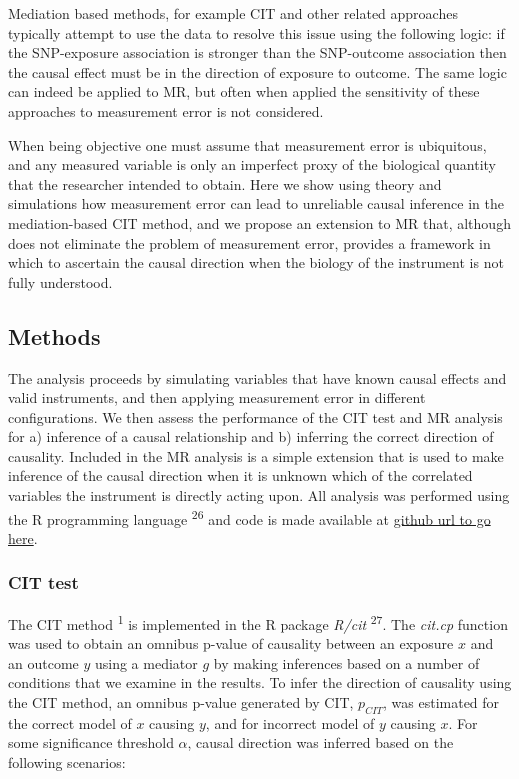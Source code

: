 \documentclass[]{article}
\begin{document}
Mediation based methods, for example CIT and other related approaches
typically attempt to use the data to resolve this issue using the
following logic: if the SNP-exposure association is stronger than the
SNP-outcome association then the causal effect must be in the direction
of exposure to outcome. The same logic can indeed be applied to MR, but
often when applied the sensitivity of these approaches to measurement
error is not considered.

When being objective one must assume that measurement error is
ubiquitous, and any measured variable is only an imperfect proxy of the
biological quantity that the researcher intended to obtain. Here we show
using theory and simulations how measurement error can lead to
unreliable causal inference in the mediation-based CIT method, and we
propose an extension to MR that, although does not eliminate the problem
of measurement error, provides a framework in which to ascertain the
causal direction when the biology of the instrument is not fully
understood.

\subsection{Methods}\label{methods}

The analysis proceeds by simulating variables that have known causal
effects and valid instruments, and then applying measurement error in
different configurations. We then assess the performance of the CIT test
and MR analysis for a) inference of a causal relationship and b)
inferring the correct direction of causality. Included in the MR
analysis is a simple extension that is used to make inference of the
causal direction when it is unknown which of the correlated variables
the instrument is directly acting upon. All analysis was performed using
the R programming language \textsuperscript{26} and code is made
available at \href{}{github url to go here}.

\subsubsection{CIT test}\label{cit-test}

The CIT method \textsuperscript{1} is implemented in the R package
\emph{R/cit} \textsuperscript{27}. The \emph{cit.cp} function was used
to obtain an omnibus p-value of causality between an exposure $x$ and an
outcome $y$ using a mediator $g$ by making inferences based on a number
of conditions that we examine in the results. To infer the direction of
causality using the CIT method, an omnibus p-value generated by CIT,
$p_{CIT}$, was estimated for the correct model of $x$ causing $y$, and
for incorrect model of $y$ causing $x$. For some significance threshold
$\alpha$, causal direction was inferred based on the following
scenarios:
\end{document}
